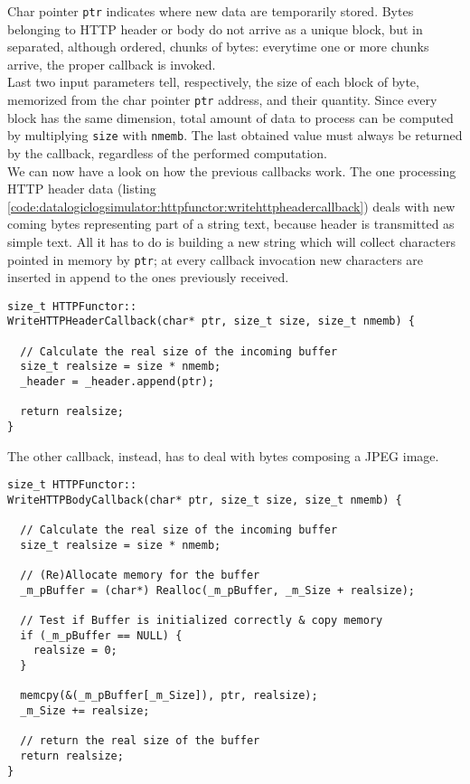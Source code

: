 Char pointer \texttt{ptr} indicates where new data are temporarily
stored. Bytes belonging to HTTP header or body do not arrive as a
unique block, but in separated, although ordered, chunks of bytes:
everytime one or more chunks arrive, the proper callback is invoked.
\\
Last two input parameters tell, respectively, the size of each
block of byte, memorized from the char pointer \texttt{ptr} address,
and their quantity. Since every block has the same dimension,
total amount of data to process can be computed by multiplying
\texttt{size} with \texttt{nmemb}. The last obtained value must
always be returned by the callback, regardless of the performed
computation.
\\
We can now have a look on how the previous callbacks work. The one
processing HTTP header data (listing
\ref{code:datalogiclogsimulator:httpfunctor:writehttpheadercallback})
deals with new coming bytes representing part of a string text, because
header is transmitted as simple text. All it has
to do is building a new string which will collect  characters
pointed in memory by \texttt{ptr}; at every callback invocation new
characters are inserted in append to the ones previously received.
\\
\begin{lstlisting}[caption={\texttt{HTTPFunctor::WriteHTTPHeaderCallback} method},
    label={code:datalogiclogsimulator:httpfunctor:writehttpheadercallback}]
size_t HTTPFunctor::
WriteHTTPHeaderCallback(char* ptr, size_t size, size_t nmemb) {

  // Calculate the real size of the incoming buffer
  size_t realsize = size * nmemb;
  _header = _header.append(ptr);
 
  return realsize;
}
\end{lstlisting}

The other callback, instead, has to deal with bytes composing
a JPEG image.
\\
\begin{lstlisting}[caption={\texttt{HTTPFunctor::WriteHTTPBodyCallback} method},
    label={code:datalogiclogsimulator:httpfunctor:writehttpbodycallback}]
size_t HTTPFunctor::
WriteHTTPBodyCallback(char* ptr, size_t size, size_t nmemb) {

  // Calculate the real size of the incoming buffer
  size_t realsize = size * nmemb;
  
  // (Re)Allocate memory for the buffer
  _m_pBuffer = (char*) Realloc(_m_pBuffer, _m_Size + realsize);
  
  // Test if Buffer is initialized correctly & copy memory
  if (_m_pBuffer == NULL) {
    realsize = 0;
  }
  
  memcpy(&(_m_pBuffer[_m_Size]), ptr, realsize);
  _m_Size += realsize;
   
  // return the real size of the buffer
  return realsize;
}
\end{lstlisting}

